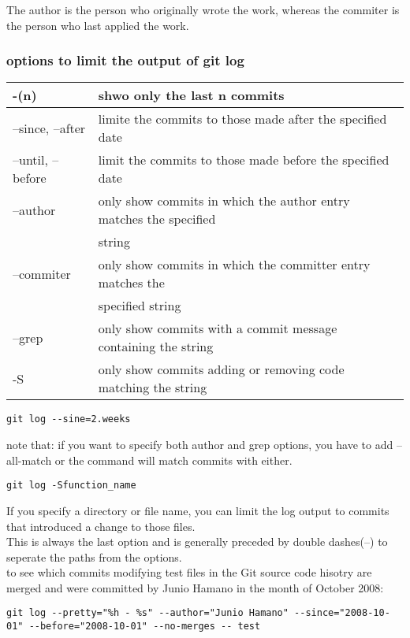 \documentclass[11pt]{article}
\begin{document}
The author is the person who originally wrote the work, whereas the commiter is the person who last applied the work.\\


\subsubsection{options to limit the output of git log}
\label{sec:org1f7b88b}

\begin{center}
\begin{tabular}{|l|l|}
\hline
-(n) & shwo only the last n commits \\
\hline
--since, --after & limite the commits to those made after the specified date \\
\hline
--until, --before & limit the commits to those made before the specified date \\
\hline
--author & only show commits in which the author entry matches the specified \\
 & string \\
\hline
--commiter & only show commits in which the committer entry matches the \\
 & specified string \\
\hline
--grep & only show commits with a commit message containing the string \\
\hline
-S & only show commits adding or removing code matching the string \\
\hline
\end{tabular}
\end{center}
\begin{verbatim}
git log --sine=2.weeks
\end{verbatim}

note that: if you want to specify both author and grep options, you have to add --all-match or the command will match commits with either.\\
\begin{verbatim}
git log -Sfunction_name
\end{verbatim}

If you specify a directory or file name, you can limit the log output to commits that introduced a change to those files.\\
This is always the last option and is generally preceded by double dashes(--) to seperate the paths from the options.\\

to see which commits modifying test files in the Git source code hisotry are merged and were committed by Junio Hamano in the month of October 2008:\\
\begin{verbatim}
git log --pretty="%h - %s" --author="Junio Hamano" --since="2008-10-01" --before="2008-10-01" --no-merges -- test
\end{verbatim}
\end{document}
